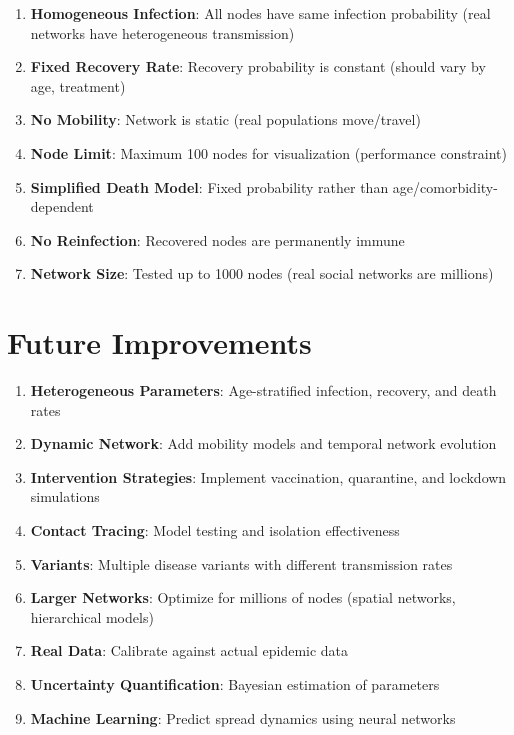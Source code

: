 \documentclass[12pt,a4paper]{article}
\begin{document}
\begin{enumerate}
    \item \textbf{Homogeneous Infection}: All nodes have same infection probability (real networks have heterogeneous transmission)
    \item \textbf{Fixed Recovery Rate}: Recovery probability is constant (should vary by age, treatment)
    \item \textbf{No Mobility}: Network is static (real populations move/travel)
    \item \textbf{Node Limit}: Maximum 100 nodes for visualization (performance constraint)
    \item \textbf{Simplified Death Model}: Fixed probability rather than age/comorbidity-dependent
    \item \textbf{No Reinfection}: Recovered nodes are permanently immune
    \item \textbf{Network Size}: Tested up to 1000 nodes (real social networks are millions)
\end{enumerate}

\section{Future Improvements}

\begin{enumerate}
    \item \textbf{Heterogeneous Parameters}: Age-stratified infection, recovery, and death rates
    \item \textbf{Dynamic Network}: Add mobility models and temporal network evolution
    \item \textbf{Intervention Strategies}: Implement vaccination, quarantine, and lockdown simulations
    \item \textbf{Contact Tracing}: Model testing and isolation effectiveness
    \item \textbf{Variants}: Multiple disease variants with different transmission rates
    \item \textbf{Larger Networks}: Optimize for millions of nodes (spatial networks, hierarchical models)
    \item \textbf{Real Data}: Calibrate against actual epidemic data
    \item \textbf{Uncertainty Quantification}: Bayesian estimation of parameters
    \item \textbf{Machine Learning}: Predict spread dynamics using neural networks
\end{enumerate}
\end{document}
